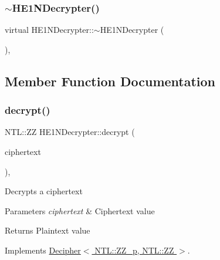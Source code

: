 \mbox{\label{classHE1NDecrypter_ae9d3f1b8d0012b99d12d24c0cc69d87e}} 
\subsubsection{\texorpdfstring{$\sim$\+H\+E1\+N\+Decrypter()}{~HE1NDecrypter()}}
{\footnotesize\ttfamily virtual H\+E1\+N\+Decrypter\+::$\sim$\+H\+E1\+N\+Decrypter (\begin{DoxyParamCaption}{ }\end{DoxyParamCaption})\hspace{0.3cm}{\ttfamily [inline]}, {\ttfamily [virtual]}}



\subsection{Member Function Documentation}
\mbox{\label{classHE1NDecrypter_a8e49ff8292a76884f328c566f4d1b646}} 
\subsubsection{\texorpdfstring{decrypt()}{decrypt()}}
{\footnotesize\ttfamily N\+T\+L\+::\+ZZ H\+E1\+N\+Decrypter\+::decrypt (\begin{DoxyParamCaption}\item[{N\+T\+L\+::\+Z\+Z\+\_\+p \&}]{ciphertext }\end{DoxyParamCaption})\hspace{0.3cm}{\ttfamily [override]}, {\ttfamily [virtual]}}

Decrypts a ciphertext 
\begin{DoxyParams}{Parameters}
{\em ciphertext} & Ciphertext value \\
\hline
\end{DoxyParams}
\begin{DoxyReturn}{Returns}
Plaintext value 
\end{DoxyReturn}


Implements \hyperlink{classDecipher_ac6b8c369eda2d7e17fa90cb594cf41b6}{Decipher$<$ N\+T\+L\+::\+Z\+Z\+\_\+p, N\+T\+L\+::\+Z\+Z $>$}.

